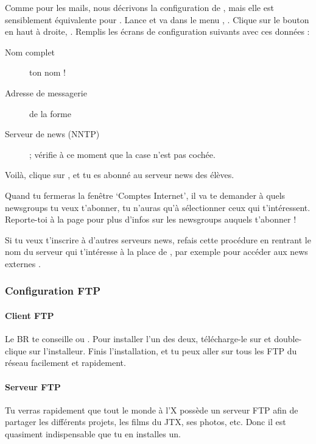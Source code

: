 Comme pour les mails, nous décrivons la configuration de , mais elle est sensiblement équivalente pour . Lance
 et va dans le menu , . Clique sur le bouton  en haut à droite,
. Remplis les écrans de configuration suivants avec ces données :
\begin{description}
  \item[Nom complet] ton nom !
  \item[Adresse de messagerie] de la forme 
  \item[Serveur de news (NNTP)] \fkz ; vérifie à ce moment que la case
        n'est pas cochée.
\end{description}
Voilà, clique sur ,  et tu es abonné
au serveur news des élèves.

Quand tu fermeras la fenêtre `Comptes Internet', il va te demander à
quels newsgroups tu veux t'abonner, tu n'auras qu'à sélectionner
ceux qui t'intéressent. Reporte-toi à la page \pageref{newsgroups}
pour plus d'infos sur les newsgroups auquels t'abonner !

Si tu veux t'inscrire à d'autres serveurs news, refais cette
procédure en rentrant le nom du serveur qui t'intéresse à la place
de \fkz, par exemple pour accéder aux news externes
.


\subsubsection{Configuration FTP}

\paragraph{Client FTP}
Le BR te conseille  ou . Pour installer l'un des deux, télécharge-le sur \xshare et double-clique sur l'installeur.
Finis l'installation, et tu peux aller sur tous les FTP du réseau
facilement et rapidement.

\paragraph{Serveur FTP}
Tu verras rapidement que tout le monde à l'X possède un serveur FTP
afin de partager les différents projets, les films du JTX, ses
photos, etc. Donc il est quasiment indispensable que tu en installes
un.

